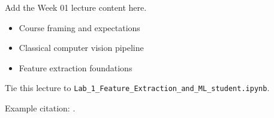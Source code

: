 Add the Week 01 lecture content here.

\begin{itemize}
  \item Course framing and expectations
  \item Classical computer vision pipeline
  \item Feature extraction foundations
\end{itemize}

Tie this lecture to \texttt{Lab\_1\_Feature\_Extraction\_and\_ML\_student.ipynb}.

Example citation: \textcite{szeliski2022}.
